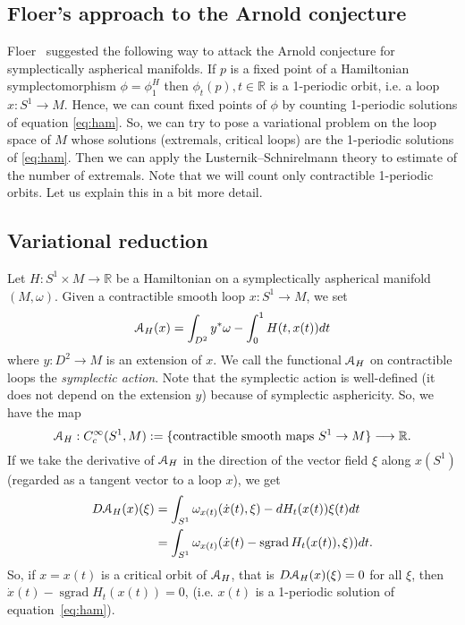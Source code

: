 \documentclass[12pt]{amsart}
\newcommand{\B}[1]{{\mathbb #1}}
\newcommand{\C}[1]{{\EuScript #1}}
\newcommand\R{\B R}
\numberwithin{equation}{section}
\theoremstyle{definition}
\theoremstyle{remark}
\numberwithin{figure}{section}
\numberwithin{table}{section}
\newcommand{\om}{{\omega}}
\newcommand{\Mo}{(M,\omega )}
\newcommand\sgrad{\operatorname{sgrad}}
\begin{document}
 
 
\subsection{Floer's approach to the Arnold conjecture} Floer~\cite{F}      
suggested the following way to attack  the Arnold conjecture for  
symplectically aspherical manifolds. If $p$ is a fixed point of a Hamiltonian  
symplectomorphism $\phi=\phi_1^H$ then $\phi_t(p), t\in \R$ is a 1-periodic  
orbit, i.e. a loop $x: S^1 \to M$. Hence, we can count fixed points of $\phi$  
by counting 1-periodic solutions of equation \eqref{eq:ham}. So, we can try to  
pose a variational problem on the loop space of $M$ whose solutions (extremals,  
critical loops) are the 1-periodic solutions of \eqref{eq:ham}. Then we can  
apply the Lusternik--Schnirelmann theory to estimate of the number of  
extremals. Note that we will count only contractible 1-periodic orbits. Let us 
explain this in a bit more detail. 
 
\subsection{Variational reduction} Let $H: S^1\times M \to \R$ be a Hamiltonian  
on a symplectically aspherical manifold $\Mo$. Given a contractible smooth loop  
$x: S^1\to M$, we set 
% 
\begin{equation}\label{eq:action}  
\C A_H(x)=\int_{D^2}y^*\om-\int_0^1H(t, x(t))dt 
\end{equation} 
% 
where $y: D^2\to M$ is an extension of $x$. We call the functional $\C A_H$ on  
contractible loops  the {\it symplectic action}. Note that the symplectic  
action is well-defined (it does not depend on the extension $y$) because of   
symplectic asphericity. So, we have the map 
$$ 
\C A_H: C^{\infty}_c(S^1,M):=\{\text{contractible smooth maps } S^1 \to M\}  
\longrightarrow \R. 
$$     
If we take the derivative of  $\C A_H$ in the direction of the vector field 
$\xi$ along  
$x(S^1)$ 
(regarded as a tangent vector to a loop $x$), we get 
% 
\begin{equation} 
\begin{aligned} 
D \C A_H(x)(\xi)&=\int_{S^1}\om_{x(t)}(\dot x(t), \xi)- dH_t(x(t)) \xi(t)dt\\ 
&=\int_{S^1}\om_{x(t)}(\dot x(t)-\sgrad H_t(x(t)), \xi))dt. 
\end{aligned} 
\end{equation} 
% 
So, if $x=x(t)$ is a critical orbit of $\C A_H$, that is $D \C A_H(x)(\xi)=0$ 
for  
all $\xi$,  then $\dot x(t)-\sgrad H_t(x(t))=0$, (i.e. $x(t)$ is a 1-periodic  
solution of equation~\eqref{eq:ham}). 
 
\end{document}
